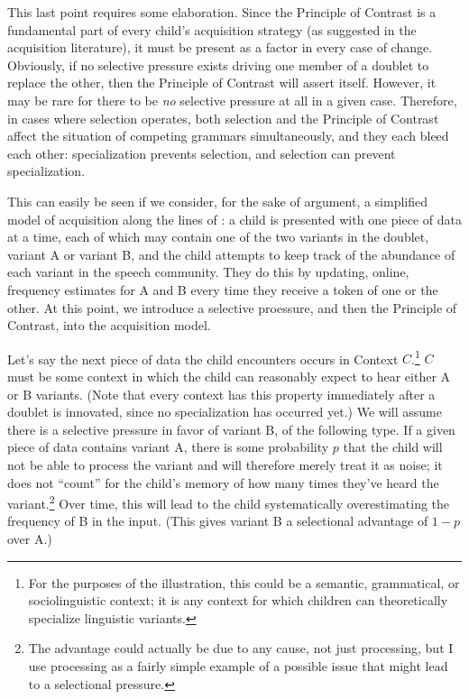 This last point requires some elaboration.
Since the Principle of Contrast is a fundamental part of every child's acquisition strategy (as suggested in the acquisition literature), it must be present as a factor in every case of change.
Obviously, if no selective pressure exists driving one member of a doublet to replace the other, then the Principle of Contrast will assert itself.
However, it may be rare for there to be \textsl{no} selective pressure at all in a given case.
Therefore, in cases where selection operates, both selection and the Principle of Contrast affect the situation of competing grammars simultaneously, and they each bleed each other: specialization prevents selection, and selection can prevent specialization.

This can easily be seen if we consider, for the sake of argument, a simplified model of acquisition along the lines of \citet{yang2000,yang2002}: a child is presented with one piece of data at a time, each of which may contain one of the two variants in the doublet, variant A or variant B, and the child attempts to keep track of the abundance of each variant in the speech community.
They do this by updating, online, frequency estimates for A and B every time they receive a token of one or the other.
At this point, we introduce a selective proessure, and then the Principle of Contrast, into the acquisition model.

Let's say the next piece of data the child encounters occurs in Context $C$.\footnote{For the purposes of the illustration, this could be a semantic, grammatical, or sociolinguistic context; it is any context for which children can theoretically specialize linguistic variants.}
$C$ must be some context in which the child can reasonably expect to hear either A or B variants. (Note that every context has this property immediately after a doublet is innovated, since no specialization has occurred yet.)
We will assume there is a selective pressure in favor of variant B, of the following type.
If a given piece of data contains variant A, there is some probability $p$ that the child will not be able to process the variant and will therefore merely treat it as noise; it does not ``count'' for the child's memory of how many times they've heard the variant.\footnote{The advantage could actually be due to any cause, not just processing, but I use processing as a fairly simple example of a possible issue that might lead to a selectional pressure.}
Over time, this will lead to the child systematically overestimating the frequency of B in the input.
(This gives variant B a selectional advantage of $1-p$ over A.)

